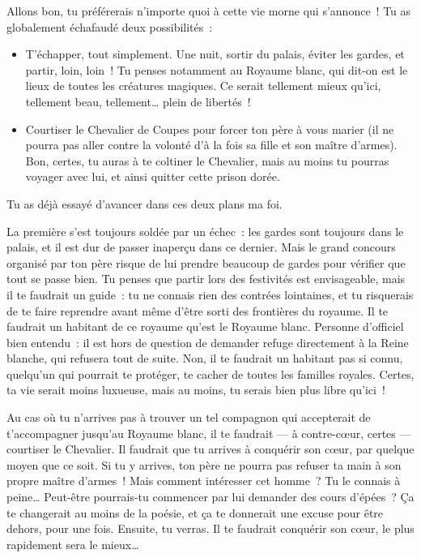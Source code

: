 {{Allons bon, tu préférerais n’importe quoi à cette vie morne qui s’annonce~!
Tu as globalement échafaudé deux possibilités~:
\begin{itemize}
	\item T’échapper, tout simplement.  Une nuit, sortir du palais, éviter les gardes, et partir, loin, loin~!
	Tu penses notamment au Royaume blanc, qui dit-on est le lieux de toutes les créatures magiques.
	Ce serait tellement mieux qu’ici, tellement beau, tellement… plein de libertés~!
	\item Courtiser le Chevalier de Coupes pour forcer ton père à vous marier (il ne pourra pas aller contre la volonté d’à la fois sa fille et son maître d’armes).
	Bon, certes, tu auras à te coltiner le Chevalier, mais au moins tu pourras voyager avec lui, et ainsi quitter cette prison dorée.
\end{itemize}
Tu as déjà essayé d’avancer dans ces deux plans ma foi.

La première s’est toujours soldée par un échec~:  les gardes sont toujours dans le palais, et il est dur de passer inaperçu dans ce dernier.
Mais le grand concours organisé par ton père risque de lui prendre beaucoup de gardes pour vérifier que tout se passe bien.
Tu penses que partir lors des festivités est envisageable, mais il te faudrait un guide~:  tu ne connais rien des contrées lointaines, et tu risquerais de te faire reprendre avant même d’être sorti des frontières du royaume.
Il te faudrait un habitant de ce royaume qu’est le Royaume blanc.  Personne d’officiel bien entendu~:  il est hors de question de demander refuge directement à la Reine blanche, qui refusera tout de suite.
Non, il te faudrait un habitant pas si connu, quelqu’un qui pourrait te protéger, te cacher de toutes les familles royales.
Certes, ta vie serait moins luxueuse, mais au moins, tu serais bien plus libre qu’ici~!

Au cas où tu n’arrives pas à trouver un tel compagnon qui accepterait de t’accompagner jusqu’au Royaume blanc, il te faudrait — à contre-cœur, certes — courtiser le Chevalier.
Il faudrait que tu arrives à conquérir son cœur, par quelque moyen que ce soit.
Si tu y arrives, ton père ne pourra pas refuser ta main à son propre maître d’armes~!
Mais comment intéresser cet homme~?  Tu le connais à peine…
Peut-être pourrais-tu commencer par lui demander des cours d’épées~?  Ça te changerait au moins de la poésie, et ça te donnerait une excuse pour être dehors, pour une fois.
Ensuite, tu verras.  Il te faudrait conquérir son cœur, le plus rapidement sera le mieux…

}}
